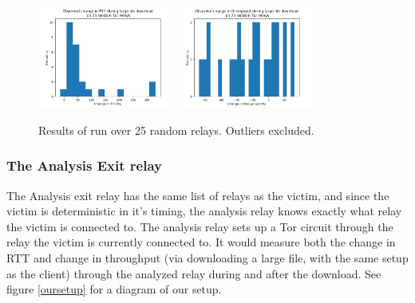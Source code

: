 \documentclass[12pt,journal]{IEEEtran}
\begin{document}
\begin{figure}
 \center
  \includegraphics[width=0.4\textwidth]{figures/rtt_avg.png}
  \includegraphics[width=0.4\textwidth]{figures/thr_avg.png}
  \caption{Results of run over 25 random relays. Outliers excluded.}
  \label{AAA}
\end{figure}

\subsubsection{The Analysis Exit relay} The Analysis exit relay has the same list of relays as the victim, and since the victim is deterministic in it's timing, the analysis relay knows exactly what relay the victim is connected to. The analysis relay sets up a Tor circuit through the relay the victim is currently connected to. It would measure both the change in RTT and change in throughput (via downloading a large file, with the same setup as the client) through the analyzed relay during and after the download. See figure \ref{oursetup} for a diagram of our setup.
\end{document}
